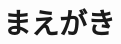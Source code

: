 \documentclass[originalpaper,fleqn]{jsaiart}     %
\author{%
 \name{金子}{純也}{Junya Kaneko}
 \affiliation{Morning Project Samurai 株式会社}%
     {Morning Project Samurai Inc.}%
     {junya@mpsamurai.com, http://www.mpsamurai.com}
\and
 \name{山田}{貢己}{Miki Yamada}
 \sameaffiliation{m.yamada@mpsamurai.com}
}
\begin{document}
\maketitle

\section{まえがき}

\end{document}
